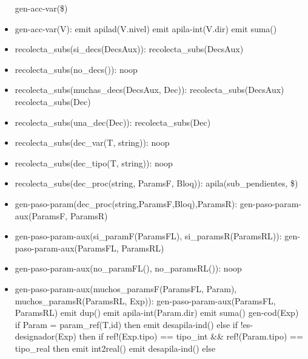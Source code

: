 \documentclass[11pt]{article}
\begin{document}
\begin{itemize}
                \subitem gen-acc-var(\$)
            \item gen-acc-var(V): 
                \subitem emit apilad(V.nivel)
                \subitem emit apila-int(V.dir)
                \subitem emit suma()
            \item recolecta\_subs(si\_decs(DecsAux)): 
                \subitem recolecta\_subs(DecsAux)
            \item recolecta\_subs(no\_decs()): 
                \subitem noop
            \item recolecta\_subs(muchas\_decs(DecsAux, Dec)): 
                \subitem recolecta\_subs(DecsAux)
                \subitem recolecta\_subs(Dec)
            \item recolecta\_subs(una\_dec(Dec)): 
                \subitem recolecta\_subs(Dec)
            \item recolecta\_subs(dec\_var(T, string)): 
                \subitem noop
            \item recolecta\_subs(dec\_tipo(T, string)): 
                \subitem noop
            \item recolecta\_subs(dec\_proc(string, ParamsF, Bloq)): 
                \subitem apila(sub\_pendientes, \$)
            \item gen-paso-param(dec\_proc(string,ParamsF,Bloq),ParamsR): 
                \subitem gen-paso-param-aux(ParamsF, ParamsR)
            \item gen-paso-param-aux(si\_paramF(ParamsFL), si\_paramsR(ParamsRL)): 
                \subitem gen-paso-param-aux(ParamsFL, ParamsRL)
            \item gen-paso-param-aux(no\_paramFL(), no\_paramsRL()): 
                \subitem noop
            \item gen-paso-param-aux(muchos\_paramsF(ParamsFL, Param), muchos\_paramsR(ParamsRL, Exp)): 
                \subitem gen-paso-param-aux(ParamsFL, ParamsRL)
                \subitem emit dup()
                \subitem emit apila-int(Param.dir)
                \subitem emit suma()
                \subitem gen-cod(Exp)
                \subitem if Param = param\_ref(T,id) then
                    \subsubitem emit desapila-ind()
                \subitem else if !es-designador(Exp) then
                    \subsubitem if ref!(Exp.tipo) == tipo\_int \&\& ref!(Param.tipo) == tipo\_real then
                        \subsubitem \hspace{2em} emit int2real()
                    \subsubitem emit desapila-ind()
                    \subsubitem else

\end{itemize}
\end{document}
